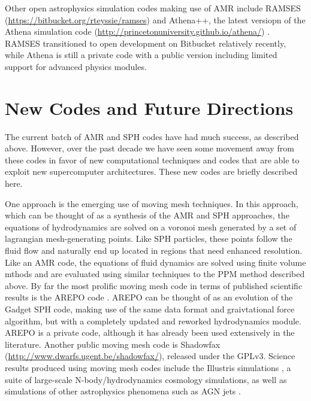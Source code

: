 \documentclass[11pt,twoside]{article}
\begin{document}
Other open astrophysics simulation codes making use of AMR include RAMSES \citep{teyssier2002} (\url{https://bitbucket.org/rteyssie/ramses}) and Athena++, the latest versiopn of the Athena simulation code (\url{http://princetonuniversity.github.io/athena/}) \citep{stone2008}. RAMSES transitioned to open development on Bitbucket relatively recently, while Athena is still a private code with a public version including limited support for advanced physics modules.

\section{New Codes and Future Directions}
\label{usm}

The current batch of AMR and SPH codes have had much success, as described above. However, over the past decade we have seen some movement away from these codes in favor of new computational techniques and codes that are able to exploit new supercomputer architectures. These new codes are briefly described here.

One approach is the emerging use of moving mesh techniques. In this approach, which can be thought of as a synthesis of the AMR and SPH approaches, the equations of hydrodynamics are solved on a voronoi mesh generated by a set of lagrangian mesh-generating points. Like SPH particles, these points follow the fluid flow and naturally end up located in regions that need enhanced resolution. Like an AMR code, the equations of fluid dynamics are solved using finite volume mthods and are evaluated using similar techniques to the PPM method described above. By far the most prolific moving mesh code in terms of published scientific results is the AREPO code \citep{springel2010}. AREPO can be thought of as an evolution of the Gadget SPH code, making use of the same data format and graivtational force algorithm, but with a completely updated and reworked hydrodynamics module. AREPO is a private code, although it has already been used extensively in the literature. Another public moving mesh code is Shadowfax \citep{vandenbroucke2016} (\url{http://www.dwarfs.ugent.be/shadowfax/}), released under the GPLv3. Science results produced using moving mesh codes include the Illustris simulations \citep{vogelsberger2014}, a suite of large-scale N-body/hydrodynamics cosmology simulations, as well as simulations of other astrophysics phenomena such as AGN jets \citep{weinberger2017}.

\end{document}
